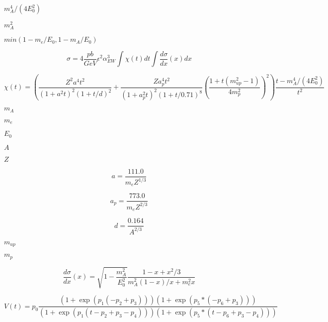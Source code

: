 \documentclass{article}
\begin{document}
$m_A^4/(4E_0^2)$
\pagebreak

$m_A^2$
\pagebreak

$min(1-m_e/E_0,1-m_A/E_0)$
\pagebreak

\[ \sigma = 4 \frac{pb}{GeV} \epsilon^2 \alpha_{EW}^3 \int \chi(t)dt \int \frac{d\sigma}{dx}(x)dx \]
\pagebreak

\[ \chi(t) = \left( \frac{Z^2a^4t^2}{(1+a^2t)^2(1+t/d)^2}+\frac{Za_p^4t^2}{(1+a_p^2t)^2(1+t/0.71)^8}\left(\frac{1+t(m_{up}^2-1)}{4m_p^2}\right)^2\right)\frac{t-m_A^4/(4E_0^2)}{t^2} \]
\pagebreak

$m_A$
\pagebreak

$m_e$
\pagebreak

$E_0$
\pagebreak

$A$
\pagebreak

$Z$
\pagebreak

\[a = \frac{111.0}{m_e Z^{1/3}}\]
\pagebreak

\[a_p = \frac{773.0}{m_e Z^{2/3}}\]
\pagebreak

\[d = \frac{0.164}{A^{2/3}}\]
\pagebreak

$m_{up}$
\pagebreak

$m_{p}$
\pagebreak

\[ \frac{d\sigma}{dx}(x) = \sqrt{1-\frac{m_A^2}{E_0^2}}\frac{1-x+x^2/3}{m_A^2(1-x)/x+m_e^2x} \]
\pagebreak

\[ V(t) = p_0\frac{(1+\exp(p_1(-p_2+p_3)))(1+\exp(p_5*(-p_6+p_3)))} {(1+\exp(p_1(t-p_2+p_3-p_4)))(1+\exp(p_5*(t-p_6+p_3-p_4)))} \]
\pagebreak
\end{document}
